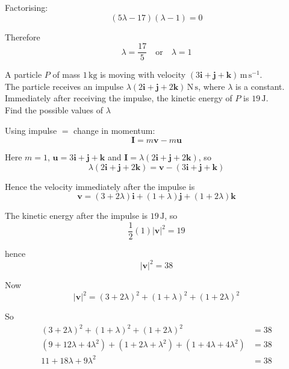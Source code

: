 \documentclass[leqno]{article}
\begin{document}
\begin{enumerate}[
  label=\textbf{\arabic*.},
  leftmargin=*,
  topsep=0pt,
  partopsep=0pt,
  parsep=0pt
]
\begin{djsSolution}
Factorising:
\[
(5\lambda-17)(\lambda-1)=0
\]

Therefore
\[
\lambda=\frac{17}{5}\quad \text{or}\quad \lambda=1
\]

\end{djsSolution}


\newpage

\questionitem

A particle $P$ of mass $1\,\mathrm{kg}$ is moving with velocity $(3\mathbf{i}+\mathbf{j}+\mathbf{k})\,\mathrm{m\,s^{-1}}$. \\

The particle receives an impulse $\lambda(2\mathbf{i}+\mathbf{j}+2\mathbf{k})\,\mathrm{N\,s}$, where $\lambda$ is a constant. \\

Immediately after receiving the impulse, the kinetic energy of $P$ is $19\,\mathrm{J}$. \\

Find the possible values of $\lambda$ 

\vspace*{10pt}

\begin{djsSolution}
Using impulse \(=\) change in momentum:
\[
\mathbf{I}=m\mathbf{v}-m\mathbf{u}
\]

Here $m=1$, $\mathbf{u}=3\mathbf{i}+\mathbf{j}+\mathbf{k}$ and $\mathbf{I}=\lambda(2\mathbf{i}+\mathbf{j}+2\mathbf{k})$, so
\[
\lambda(2\mathbf{i}+\mathbf{j}+2\mathbf{k})=\mathbf{v}-(3\mathbf{i}+\mathbf{j}+\mathbf{k})
\]

Hence the velocity immediately after the impulse is
\[
\mathbf{v}=(3+2\lambda)\mathbf{i}+(1+\lambda)\mathbf{j}+(1+2\lambda)\mathbf{k}
\]

The kinetic energy after the impulse is $19\,\mathrm{J}$, so
\[
\frac12(1)\lvert \mathbf{v}\rvert^2=19
\]

hence
\[
\lvert \mathbf{v}\rvert^2=38
\]

Now
\[
\lvert \mathbf{v}\rvert^2=(3+2\lambda)^2+(1+\lambda)^2+(1+2\lambda)^2
\]

So
\begin{align*}
(3+2\lambda)^2+(1+\lambda)^2+(1+2\lambda)^2&=38 \\
(9+12\lambda+4\lambda^2)+(1+2\lambda+\lambda^2)+(1+4\lambda+4\lambda^2)&=38 \\
11+18\lambda+9\lambda^2&=38
\end{align*}


\end{djsSolution}
\end{enumerate}
\end{document}
